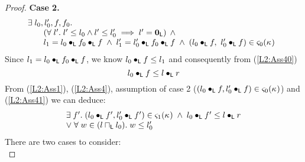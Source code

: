 \begin{lemma}[]
\begin{proof}
%
%
%
%
\noindent\textbf{Case 2.} 
%
\[
\begin{array}{l}
	\exists\; l_0, l'_0, f, f_0.\; \\
  \hspace*{0.5cm}
  \begin{array}{l}
  	\left(\forall\; l'.\; l' \leq l_0 \land l' \leq l'_0 \implies l' = \mathbf{0}_{\textsf{L}}\right)\;\land\\
  	l_1 = l_0 \bullet_{\textsf{L}} f_0 \bullet_{\textsf{L}} f \;\land\; l'_1 = l'_0 \bullet_{\textsf{L}} f_0 \bullet_{\textsf{L}} f \;\land\;
  	(l_0 \bullet_{\textsf{L}} f,\ l'_0 \bullet_{\textsf{L}} f) \in \varsigma_{0}(\kappa_{}) 
  \end{array} 
\end{array}
\]
%
Since $l_1 = l_0 \bullet_{\textsf{L}} f_0 \bullet_{\textsf{L}} f$, we know $l_0 \bullet_{\textsf{L}} f \leq l_1$ and consequently from (\ref{L2:Ass40})
%
\begin{equation}
	l_0 \bullet_{\textsf{L}} f \leq l \bullet_{\textsf{L}} r \label{L2:Ass41}
\end{equation}
%
From (\ref{L2:Ass1}), (\ref{L2:Ass4}), assumption of case 2 ($(l_0 \bullet_{\textsf{L}} f, l'_0 \bullet_{\textsf{L}} f) \in \varsigma_{0}(\kappa_{})$) and (\ref{L2:Ass41}) we can deduce:
\begin{align}
\begin{array}{l}
	\exists\; f'.\; (l_0 \bullet_{\textsf{L}} f', l'_0 \bullet_{\textsf{L}} f') \in \varsigma_{1}(\kappa_{}) \;\land\; l_0 \bullet_{\textsf{L}} f' \leq l \bullet_{\textsf{L}} r\\
	\lor\; \forall\; w \in (l \sqcap_{\textsf{L}} l_0).\; w \leq l'_0
\end{array} \nonumber
\end{align}
%
There are two cases to consider:\\


\end{proof}
\end{lemma}
